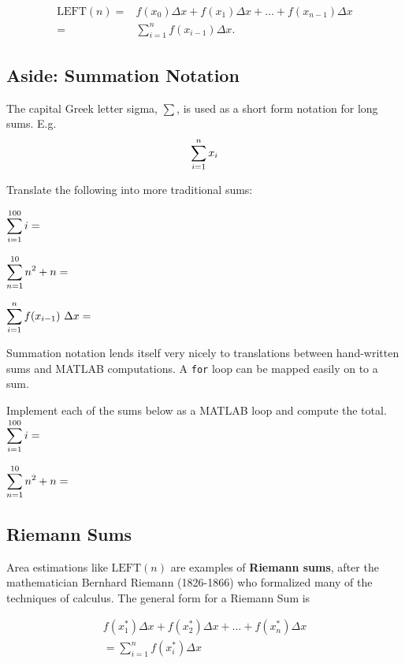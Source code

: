 \begin{align*}
  \mbox{LEFT}(n) = & f(x_{0}) \Delta x+ 
 f(x_{1}) \Delta x + \ldots + 
 f(x_{n-1}) \Delta x 
\\  = & \displaystyle\sum_{i=1}^{n} f(x_{i-1})\Delta x.
\end{align*}

\newpage

\subsection*{Aside: Summation Notation}

The capital Greek letter sigma, $\sum$, is used as a short form notation for long sums.
E.g.
$$\displaystyle \sum_{i=1}^n x_i$$

\newpage
\problem 
Translate the following into more traditional sums:

$\displaystyle \sum_{i=1}^{100} i= $ \vfill 

$\displaystyle \sum_{n=1}^{10} n^2 + n= $  \vfill

$\displaystyle \sum_{i=1}^{n}  f(x_{i-1}) ~\Delta x= $
\vfill

\newpage 

Summation notation lends itself very nicely to translations between
hand-written sums and MATLAB computations.  A \texttt{for} loop can be
mapped easily on to a sum.

\problem Implement each of the sums below as a MATLAB loop and compute
the total. \\

$\displaystyle \sum_{i=1}^{100} i= $ \vfill 

$\displaystyle \sum_{n=1}^{10} n^2 + n= $  \vfill

\newpage


\subsection*{Riemann Sums}

Area estimations like $\mbox{LEFT}(n)$ are examples of {\bf Riemann sums},
after the mathematician Bernhard Riemann (1826-1866) who formalized
many of the techniques of calculus.  The general form for a Riemann
Sum is

\begin{align*}
 f(x_{1}^{*}) \Delta x+ f(x_{2}^{*}) \Delta x + \ldots + f(x_{n}^{*}) \Delta x 
 \\ = \displaystyle\sum_{i=1}^{n} f(x_{i}^{*})\Delta x
\end{align*}

